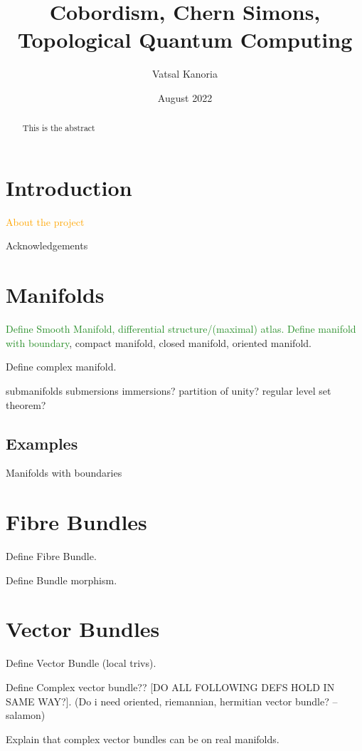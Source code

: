 \documentclass[a4paper]{article}
\theoremstyle{definition} \newtheorem*{definition}{Definition}
\theoremstyle{definition} \newtheorem*{definitions}{Definitions}
\theoremstyle{plain} \newtheorem{theorem}{Theorem}[section]
\theoremstyle{plain} \newtheorem{proposition}[theorem]{Proposition}
\theoremstyle{plain} \newtheorem{corollary}[theorem]{Corollary}
\theoremstyle{plain} \newtheorem{lemma}[theorem]{Lemma}
\theoremstyle{plain} \newtheorem{example}[theorem]{Example}
\newcommand{\done}[1]{\textcolor{ForestGreen}{#1}}
\newcommand{\finish}[1]{\textcolor{orange}{#1}}
\begin{document}
\title{Cobordism, Chern Simons, Topological Quantum Computing}
\author{Vatsal Kanoria}
\date{August 2022}
\maketitle
\begin{abstract}
This is the abstract
\end{abstract}
\tableofcontents

\section{Introduction}

\finish{About the project}

Acknowledgements

\section{Manifolds}

\done{Define Smooth Manifold, differential structure/(maximal) atlas.
Define manifold with boundary}, 
compact manifold, closed manifold, oriented manifold.

Define complex manifold.

submanifolds submersions immersions? partition of unity? regular level set theorem?

\subsection{Examples}

Manifolds with boundaries

\section{Fibre Bundles}

Define Fibre Bundle.

Define Bundle morphism.

\section{Vector Bundles}

Define Vector Bundle (local trivs).

Define Complex vector bundle?? [DO ALL FOLLOWING DEFS HOLD IN SAME WAY?]. (Do i need oriented, riemannian, hermitian vector bundle? -- salamon)

Explain that complex vector bundles can be on real manifolds.
\end{document}
